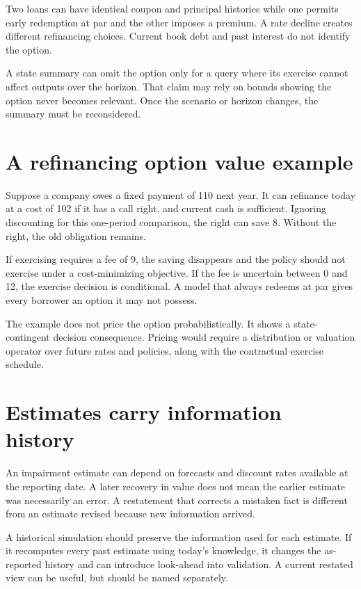 Two loans can have identical coupon and principal histories while one permits early redemption at par and the other imposes a premium. A rate decline creates different refinancing choices. Current book debt and past interest do not identify the option.

A state summary can omit the option only for a query where its exercise cannot affect outputs over the horizon. That claim may rely on bounds showing the option never becomes relevant. Once the scenario or horizon changes, the summary must be reconsidered.

\section{A refinancing option value example}
Suppose a company owes a fixed payment of 110 next year. It can refinance today at a cost of 102 if it has a call right, and current cash is sufficient. Ignoring discounting for this one-period comparison, the right can save 8. Without the right, the old obligation remains.

If exercising requires a fee of 9, the saving disappears and the policy should not exercise under a cost-minimizing objective. If the fee is uncertain between 0 and 12, the exercise decision is conditional. A model that always redeems at par gives every borrower an option it may not possess.

The example does not price the option probabilistically. It shows a state-contingent decision consequence. Pricing would require a distribution or valuation operator over future rates and policies, along with the contractual exercise schedule.

\section{Estimates carry information history}
An impairment estimate can depend on forecasts and discount rates available at the reporting date. A later recovery in value does not mean the earlier estimate was necessarily an error. A restatement that corrects a mistaken fact is different from an estimate revised because new information arrived.

A historical simulation should preserve the information used for each estimate. If it recomputes every past estimate using today's knowledge, it changes the as-reported history and can introduce look-ahead into validation. A current restated view can be useful, but should be named separately.

